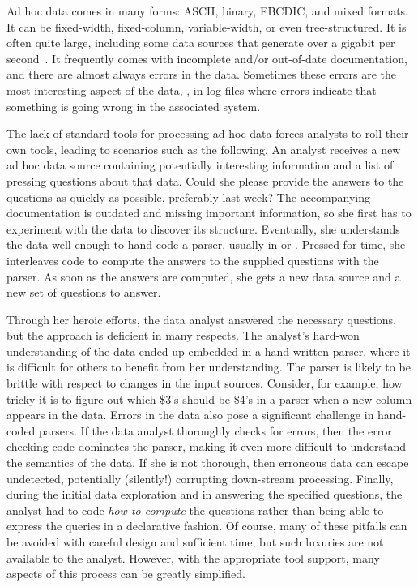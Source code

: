 Ad hoc data comes in many forms: ASCII, binary, EBCDIC, and mixed
formats.  It can be fixed-width, fixed-column, variable-width, or even
tree-structured. It is often quite large, including some data sources
that generate over a gigabit per second~\cite{gigascope}. It frequently
comes with incomplete and/or out-of-date documentation, and there are
almost always errors in the data.  Sometimes these errors are the most
interesting aspect of the data, \eg{}, in log files where
errors indicate that something is going wrong in the associated system.


The lack of standard tools for processing ad hoc data forces
analysts to roll their own tools, leading to scenarios such as the
following.  An analyst receives a new ad hoc data source containing
potentially interesting information and a list of pressing questions
about that data.  Could she please provide the answers to the
questions as quickly as possible, preferably last week?  The
accompanying documentation is outdated and missing important
information, so she first has to experiment with the data to discover
its structure.   Eventually, she understands the data well enough to hand-code a
parser, usually in \C{} or \perl{}.  Pressed for time, she interleaves
code to compute the answers to the supplied questions with the parser.
As soon as the answers are computed, she gets a new data source and a
new set of questions to answer.

Through her heroic efforts, the data analyst answered
the necessary questions, but the approach is deficient in many
respects.  
The analyst's hard-won understanding of the data ended up embedded in
a hand-written parser, where it is difficult for others to benefit
from her understanding.
The parser is likely to be brittle with respect to changes in the
input sources.  Consider, for example, how tricky it is to
figure out which \$3's should be \$4's in a \perl{} parser when a new
column appears in the data.
Errors in the data also pose a significant challenge in hand-coded
parsers.  If the data analyst thoroughly checks for errors, then
the error checking code dominates the parser, making it even more
difficult to understand the semantics of the data.  If she is not thorough,
then erroneous data can escape undetected, potentially (silently!)
corrupting down-stream processing.
Finally, during the initial data exploration and in answering the
specified questions, the analyst had to code \textit{how to compute}
the questions rather than being able to express the queries in a
declarative fashion. 
Of course, many of these pitfalls can be avoided with careful design
and sufficient time, but such luxuries are not available to the analyst.
However, with the appropriate tool support, many aspects of this
process can be greatly simplified.


